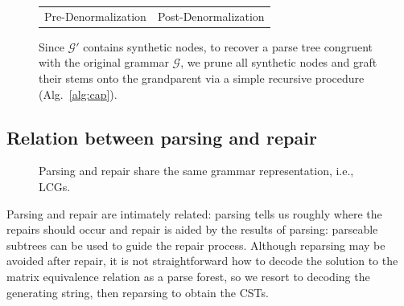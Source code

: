 \documentclass[sigplan,review,anonymous,acmsmall]{acmart}\settopmatter{printfolios=false,printccs=false,printacmref=false}
\begin{document}
\begin{figure}[H]
{\begin{tabular}{ll}
      \hspace{1cm}\Huge{Pre-Denormalization} & \hspace{2cm}\Huge{Post-Denormalization}
    \end{tabular}
  }
  \caption{Since $\mathcal{G}'$ contains synthetic nodes, to recover a parse tree congruent with the original grammar $\mathcal{G}$, we prune all synthetic nodes and graft their stems onto the grandparent via a simple recursive procedure (Alg.~\ref{alg:cap}).}%
\end{figure}

\subsection{Relation between parsing and repair}\label{sec:sat}

\begin{figure}
  \vspace{-20pt}
  \resizebox{.4\textwidth}{!}{}
  \caption{Parsing and repair share the same grammar representation, i.e., LCGs.}
\end{figure}

Parsing and repair are intimately related: parsing tells us roughly where the repairs should occur and repair is aided by the results of parsing: parseable subtrees can be used to guide the repair process. Although reparsing may be avoided after repair, it is not straightforward how to decode the solution to the matrix equivalence relation as a parse forest, so we resort to decoding the generating string, then reparsing to obtain the CSTs.

\end{document}
